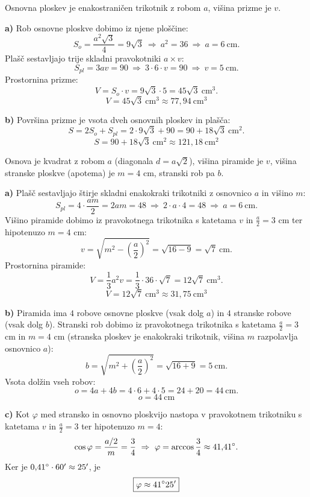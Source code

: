 \documentclass[a4paper,12pt]{letter}
\begin{document}
\newpage
\begin{resitev}
Osnovna ploskev je enakostrani\v{c}en trikotnik z robom $a$, vi\v{s}ina prizme je $v$.

\textbf{a)} Rob osnovne ploskve dobimo iz njene plo\v{s}\v{c}ine:
\[
S_o=\frac{a^2\sqrt3}{4}=9\sqrt3\ \Rightarrow\ a^2=36\ \Rightarrow\ a=6\ \text{cm}.
\]
Pla\v{s}\v{c} sestavljajo trije skladni pravokotniki $a\times v$:
\[
S_{pl}=3av=90\ \Rightarrow\ 3\cdot6\cdot v=90\ \Rightarrow\ v=5\ \text{cm}.
\]
Prostornina prizme:
\[
V=S_o\cdot v=9\sqrt3\cdot5=45\sqrt3\ \text{cm}^3.
\]
\[
\boxed{V=45\sqrt3\ \text{cm}^3\approx77{,}94\ \text{cm}^3}
\]

\textbf{b)} Povr\v{s}ina prizme je vsota dveh osnovnih ploskev in pla\v{s}\v{c}a:
\[
S=2S_o+S_{pl}=2\cdot9\sqrt3+90=90+18\sqrt3\ \text{cm}^2.
\]
\[
\boxed{S=90+18\sqrt3\ \text{cm}^2\approx121{,}18\ \text{cm}^2}
\]
\end{resitev}

\newpage
\begin{resitev}
Osnova je kvadrat z robom $a$ (diagonala $d=a\sqrt2$), vi\v{s}ina piramide je $v$, vi\v{s}ina stranske ploskve (apotema) je $m=4$ cm, stranski rob pa $b$.

\textbf{a)} Pla\v{s}\v{c} sestavljajo \v{s}tirje skladni enakokraki trikotniki z osnovnico $a$ in vi\v{s}ino $m$:
\[
S_{pl}=4\cdot\frac{am}{2}=2am=48\ \Rightarrow\ 2\cdot a\cdot4=48\ \Rightarrow\ a=6\ \text{cm}.
\]
Vi\v{s}ino piramide dobimo iz pravokotnega trikotnika s katetama $v$ in $\frac a2=3$ cm ter hipotenuzo $m=4$ cm:
\[
v=\sqrt{m^2-\left(\frac a2\right)^2}=\sqrt{16-9}=\sqrt7\ \text{cm}.
\]
Prostornina piramide:
\[
V=\frac13a^2v=\frac13\cdot36\cdot\sqrt7=12\sqrt7\ \text{cm}^3.
\]
\[
\boxed{V=12\sqrt7\ \text{cm}^3\approx31{,}75\ \text{cm}^3}
\]

\textbf{b)} Piramida ima $4$ robove osnovne ploskve (vsak dolg $a$) in $4$ stranske robove (vsak dolg $b$). Stranski rob dobimo iz pravokotnega trikotnika s katetama $\frac a2=3$ cm in $m=4$ cm (stranska ploskev je enakokraki trikotnik, vi\v{s}ina $m$ razpolavlja osnovnico $a$):
\[
b=\sqrt{m^2+\left(\frac a2\right)^2}=\sqrt{16+9}=5\ \text{cm}.
\]
Vsota dol\v{z}in vseh robov:
\[
o=4a+4b=4\cdot6+4\cdot5=24+20=44\ \text{cm}.
\]
\[
\boxed{o=44\ \text{cm}}
\]

\textbf{c)} Kot $\varphi$ med stransko in osnovno ploskvijo nastopa v pravokotnem trikotniku s katetama $v$ in $\frac a2=3$ ter hipotenuzo $m=4$:
\[
\cos\varphi=\frac{a/2}{m}=\frac34\ \Rightarrow\ \varphi=\arccos\frac34\approx41{,}41\degree.
\]
Ker je $0{,}41\degree\cdot60'\approx25'$, je
\[
\boxed{\varphi\approx41\degree25'}
\]
\end{resitev}
\end{document}
